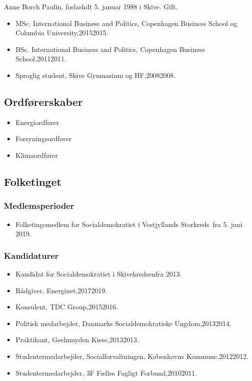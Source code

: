 \documentclass[11pt, a4paper]{awesome-cv}
\begin{document}
\makecvheader[R]
\makelettertitle
\begin{cvletter}
Anne Borch Paulin, foslashdt 5. januar 1988 i Skive. Gift.

\begin{itemize}
\item MSc. International Business and Politics, Copenhagen Business School og Columbia University,20152015.
\item BSc. International Business and Politics, Copenhagen Business School,20112011.
\item Sproglig student, Skive Gymnasium og HF,20082008.
\end{itemize}
\subsection*{Ordførerskaber}
\begin{itemize}
\item Energiordfører
\item Forsyningsordfører
\item Klimaordfører
\end{itemize}
\subsection*{Folketinget}
\subsubsection*{Medlemsperioder}
\begin{itemize}
\item Folketingsmedlem for Socialdemokratiet i Vestjyllands Storkreds fra 5. juni 2019.
\end{itemize}
\subsubsection*{Kandidaturer}
\begin{itemize}
\item Kandidat for Socialdemokratiet i Skivekredsenfra 2013.
\end{itemize}
\begin{itemize}
\item Rådgiver, Energinet,20172019.
\item Konsulent, TDC Group,20152016.
\item Politisk medarbejder, Danmarks Socialdemokratiske Ungdom,20132014.
\item Praktikant, Geelmuyden Kiese,20132013.
\item Studentermedarbejder, Socialforvaltningen, Københavns Kommune,20122012.
\item Studentermedarbejder, 3F  Fælles Fagligt Forbund,20102011.
\end{itemize}
\end{cvletter}
\end{document}
